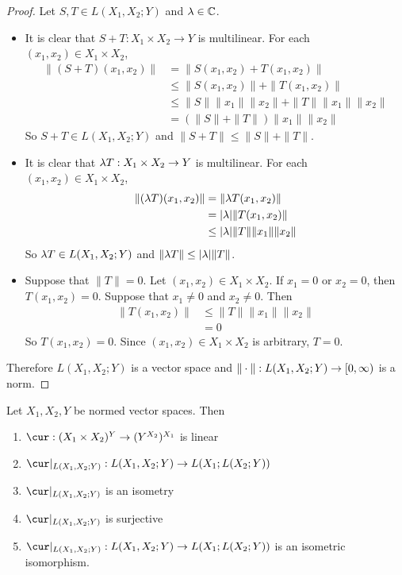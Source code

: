 \documentclass{book}
\begin{document}
	\begin{proof}
		Let $S,T \in L(X_1,X_2;Y)$ and $\lambda \in \mathbb{C}$.
		\begin{itemize}
			\item It is clear that $S+T : X_1 \times X_2 \rightarrow Y$ is multilinear. For each $(x_1, x_2) \in X_1 \times X_2$,
			\begin{align*}
				\|(S+T)(x_1, x_2)\|
				& = \|S(x_1, x_2) + T(x_1, x_2)\| \\
				& \leq  \|S(x_1, x_2) \| + \|T(x_1, x_2)\| \\
				& \leq \|S\|\|x_1\| \|x_2\| + \|T\|\|x_1\| \|x_2\| \\
				& = (\|S\| + \|T\|)\|x_1\| \|x_2\|
			\end{align*}
			So $S+T \in L(X_1, X_2;Y)$ and $\|S+T\|\leq \|S \|+ \|T \|$.
			\item It is clear that $\lambda T : X_1 \times X_2 \rightarrow Y$ is multilinear. For each $(x_1, x_2) \in X_1 \times X_2$,
			\begin{align*}
				\|(\lambda T)(x_1, x_2)\| 
				& = \|\lambda T(x_1, x_2)\| \\
				& = |\lambda| \|T(x_1, x_2)\| \\
				& \leq |\lambda| \|T\| \|x_1\| \|x_2\|
			\end{align*}
			So $\lambda T \in L(X_1, X_2;Y)$ and $\|\lambda T\| \leq |\lambda| \|T\|$.
			\item Suppose that $\|T\| = 0$. Let $(x_1, x_2) \in X_1 \times X_2$. If $x_1 = 0$ or $x_2 = 0$, then $T(x_1,x_2) = 0$. Suppose that $x_1 \neq 0$ and $x_2 \neq 0$. Then 
			\begin{align*}
				\|T(x_1, x_2)\|
				& \leq  \|T\|\|x_1\|\|x_2\| \\
				& = 0
			\end{align*}
			So $T(x_1, x_2) = 0$. Since $(x_1, x_2) \in X_1 \times X_2$ is arbitrary, $T = 0$.
		\end{itemize}
		Therefore $L(X_1, X_2; Y)$ is a vector space and $\|\cdot\|: L(X_1, X_2; Y) \rightarrow [0,\infty)$ is a norm.
	\end{proof}
	
	\begin{ex} 
	Let $X_1, X_2, Y$ be normed vector spaces. Then 
	\begin{enumerate}
		\item $\cur: (X_1 \times X_2)^Y \rightarrow (Y^{X_2})^{X_1}$ is linear
		\item $\cur|_{L(X_1, X_2;Y)}: L(X_1, X_2;Y) \rightarrow L(X_1; L(X_2;Y))$
		\item $\cur|_{L(X_1, X_2;Y)}$ is an isometry
		\item $\cur|_{L(X_1, X_2;Y)}$ is surjective
		\item $\cur|_{L(X_1, X_2;Y)}: L(X_1, X_2;Y) \rightarrow L(X_1; L(X_2;Y))$ is an isometric isomorphism.
	\end{enumerate}
	\end{ex}
	
\end{document}
